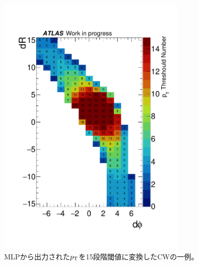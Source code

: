 

\begin{figure}[tb]
  \centering
  \hspace*{-1cm}
  \includegraphics[clip, width=9cm]{fig/4/data_phi0_roi33_15thr.pdf}
  \caption{MLPから出力された$p_{\rm{T}}$を15段階閾値に変換したCWの一例。}
    \label{CW}
\end{figure}